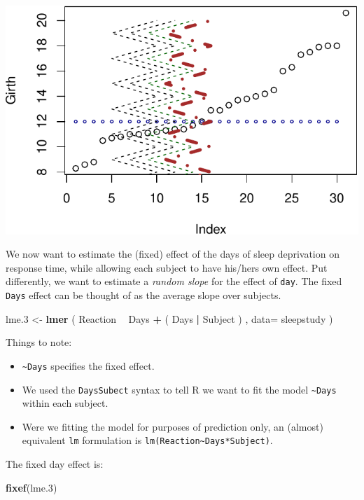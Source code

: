 \documentclass[]{book}
\newenvironment{Shaded}{\begin{snugshade}}{\end{snugshade}}
\newcommand{\DataTypeTok}[1]{\textcolor[rgb]{0.13,0.29,0.53}{#1}}
\newcommand{\FloatTok}[1]{\textcolor[rgb]{0.00,0.00,0.81}{#1}}
\newcommand{\KeywordTok}[1]{\textcolor[rgb]{0.13,0.29,0.53}{\textbf{#1}}}
\newcommand{\NormalTok}[1]{#1}
\newcommand{\OperatorTok}[1]{\textcolor[rgb]{0.81,0.36,0.00}{\textbf{#1}}}
\newcommand{\StringTok}[1]{\textcolor[rgb]{0.31,0.60,0.02}{#1}}
\providecommand{\tightlist}{%
  \setlength{\itemsep}{0pt}\setlength{\parskip}{0pt}}
\theoremstyle{definition}
\theoremstyle{definition}
\theoremstyle{definition}
\theoremstyle{remark}
\begin{document}
\includegraphics[width=0.5\linewidth]{Rcourse_files/figure-latex/unnamed-chunk-211-1}

We now want to estimate the (fixed) effect of the days of sleep deprivation on response time, while allowing each subject to have his/hers own effect.
Put differently, we want to estimate a \emph{random slope} for the effect of \texttt{day}.
The fixed \texttt{Days} effect can be thought of as the average slope over subjects.

\begin{Shaded}
\begin{Highlighting}[]
\NormalTok{lme}\FloatTok{.3}\NormalTok{ <-}\StringTok{ }\KeywordTok{lmer}\NormalTok{ ( Reaction }\OperatorTok{~}\StringTok{ }\NormalTok{Days }\OperatorTok{+}\StringTok{ }\NormalTok{( Days }\OperatorTok{|}\StringTok{ }\NormalTok{Subject ) , }\DataTypeTok{data=}\NormalTok{ sleepstudy )}
\end{Highlighting}
\end{Shaded}

Things to note:

\begin{itemize}
\tightlist
\item
  \texttt{\textasciitilde{}Days} specifies the fixed effect.
\item
  We used the \texttt{Days\textbar{}Subect} syntax to tell R we want to fit the model \texttt{\textasciitilde{}Days} within each subject.
\item
  Were we fitting the model for purposes of prediction only, an (almost) equivalent \texttt{lm} formulation is \texttt{lm(Reaction\textasciitilde{}Days*Subject)}.
\end{itemize}

The fixed day effect is:

\begin{Shaded}
\begin{Highlighting}[]
\KeywordTok{fixef}\NormalTok{(lme}\FloatTok{.3}\NormalTok{)}
\end{Highlighting}
\end{Shaded}
\end{document}
